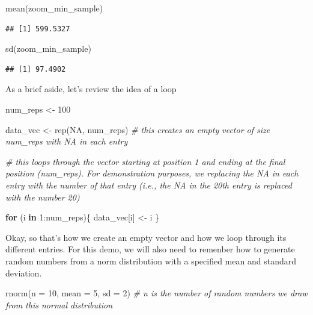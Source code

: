 \documentclass[
]{book}
\newenvironment{Shaded}{\begin{snugshade}}{\end{snugshade}}
\newcommand{\AttributeTok}[1]{\textcolor[rgb]{0.77,0.63,0.00}{#1}}
\newcommand{\CommentTok}[1]{\textcolor[rgb]{0.56,0.35,0.01}{\textit{#1}}}
\newcommand{\ConstantTok}[1]{\textcolor[rgb]{0.00,0.00,0.00}{#1}}
\newcommand{\ControlFlowTok}[1]{\textcolor[rgb]{0.13,0.29,0.53}{\textbf{#1}}}
\newcommand{\DecValTok}[1]{\textcolor[rgb]{0.00,0.00,0.81}{#1}}
\newcommand{\FunctionTok}[1]{\textcolor[rgb]{0.00,0.00,0.00}{#1}}
\newcommand{\NormalTok}[1]{#1}
\newcommand{\OtherTok}[1]{\textcolor[rgb]{0.56,0.35,0.01}{#1}}
\newcommand{\SpecialCharTok}[1]{\textcolor[rgb]{0.00,0.00,0.00}{#1}}
\begin{document}
\begin{Shaded}
\begin{Highlighting}[]
\FunctionTok{mean}\NormalTok{(zoom\_min\_sample)}
\end{Highlighting}
\end{Shaded}

\begin{verbatim}
## [1] 599.5327
\end{verbatim}

\begin{Shaded}
\begin{Highlighting}[]
\FunctionTok{sd}\NormalTok{(zoom\_min\_sample)}
\end{Highlighting}
\end{Shaded}

\begin{verbatim}
## [1] 97.4902
\end{verbatim}

As a brief aside, let's review the idea of a loop

\begin{Shaded}
\begin{Highlighting}[]
\NormalTok{num\_reps }\OtherTok{\textless{}{-}} \DecValTok{100}

\NormalTok{data\_vec }\OtherTok{\textless{}{-}} \FunctionTok{rep}\NormalTok{(}\ConstantTok{NA}\NormalTok{, num\_reps) }\CommentTok{\# this creates an empty vector of size num\_reps with NA in each entry}

\CommentTok{\# this loops through the vector starting at position 1 and ending at the final position (num\_reps). For demonstration purposes, we replacing the NA in each entry with the number of that entry (i.e., the NA in the 20th entry is replaced with the number 20)}

\ControlFlowTok{for}\NormalTok{ (i }\ControlFlowTok{in} \DecValTok{1}\SpecialCharTok{:}\NormalTok{num\_reps)\{}
\NormalTok{  data\_vec[i] }\OtherTok{\textless{}{-}}\NormalTok{ i}
\NormalTok{\}}
\end{Highlighting}
\end{Shaded}

Okay, so that's how we create an empty vector and how we loop through its different entries. For this demo, we will also need to remenber how to generate random numbers from a norm distribution with a specified mean and standard deviation.

\begin{Shaded}
\begin{Highlighting}[]
\FunctionTok{rnorm}\NormalTok{(}\AttributeTok{n =} \DecValTok{10}\NormalTok{, }\AttributeTok{mean =} \DecValTok{5}\NormalTok{, }\AttributeTok{sd =} \DecValTok{2}\NormalTok{) }\CommentTok{\# n is the number of random numbers we draw from this normal distribution}
\end{Highlighting}
\end{Shaded}
\end{document}
